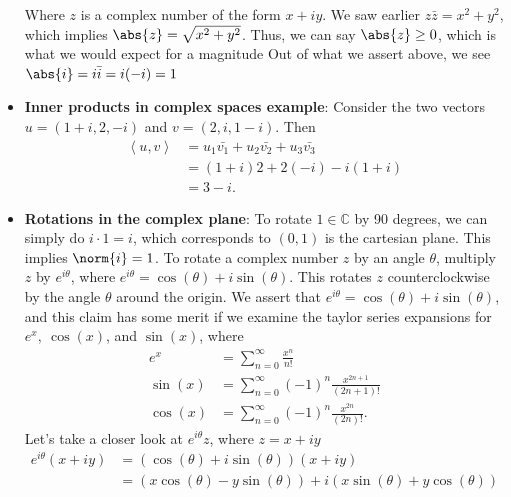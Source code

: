 \documentclass{report}
\begin{document}
\begin{itemize}
            Where $z$ is a complex number of the form $x + iy$. We saw earlier $z\bar{z}  = x^{2} + y^{2} $, which implies $\abs{z} = \sqrt{x^{2} + y^{2}} $. Thus, we can say $\abs{z} \geq 0$, which is what we would expect for a magnitude
            \bigbreak \noindent 
            Out of what we assert above, we see $\abs{i} =  i\bar{i} = i(-i) = 1$
        \item \textbf{Inner products in complex spaces example}:  Consider the two vectors $u= (1+i, 2, -i) $ and $ v = (2,i,1-i)$. Then
            \begin{align*}
                \left\langle u,v \right\rangle &= u_{1}\bar{v_{1}} +   u_{2}\bar{v_{2}} + u_{3}\bar{v_{3}} \\
                                               &= (1+i)2 + 2(-i) -i(1+i) \\
                                               &= 3-i
            .\end{align*}
        \item \textbf{Rotations in the complex plane}: To rotate $1\in \mathbb{C}$ by 90 degrees, we can simply do $i \cdot 1 =  i$, which corresponds to $(0,1)$ is the cartesian plane. This implies $\norm{i} = 1 $. 
            \bigbreak \noindent 
            To rotate a complex number $z$ by an angle $\theta$, multiply $z$ by $e^{i\theta}$, where $e^{i\theta }  = \cos{\left(\theta \right)} + i\sin{\left(\theta \right)}$. This rotates $z$ counterclockwise by the angle $\theta $ around the origin.
            \bigbreak \noindent 
            We assert that $e^{i\theta }  = \cos{\left(\theta \right)} + i\sin{\left(\theta \right)}$, and this claim has some merit if we examine the taylor series expansions for $e^{x},\ \cos{\left(x\right)}$, and $\sin{\left(x \right)}$, where 
            \begin{align*}
                e^{x} &= \sum_{n=0}^{\infty} \frac{x^{n}}{n!} \\
                \sin{\left(x\right)} &= \sum_{n=0}^{\infty} (-1)^{n} \frac{x^{2n+1}}{(2n+1)!} \\
                \cos{\left(x\right)} &= \sum_{n=0}^{\infty} (-1)^{n} \frac{x^{2n}}{(2n)!}
            .\end{align*}
            \bigbreak \noindent 
            Let's take a closer look at $e^{i\theta }z$, where $z=x + iy$
            \begin{align*}
                e^{i\theta }(x+iy)&= (\cos{\left(\theta \right)} + i\sin{\left(\theta \right)})(x+iy) \\
                                  &=(x\cos{\left(\theta \right)} - y\sin{\left(\theta \right)}) + i(x\sin{\left(\theta \right)} + y\cos{\left(\theta \right)}) 

\end{align*}
\end{itemize}
\end{document}
